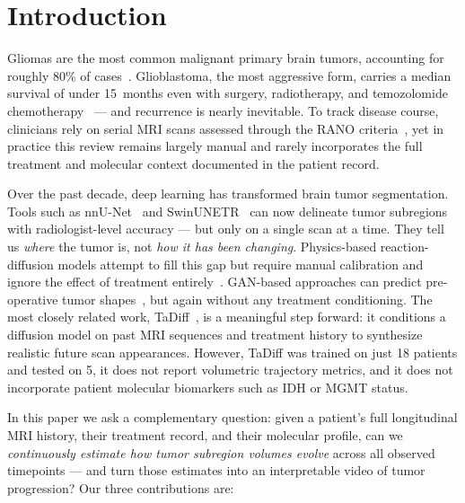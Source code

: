 \documentclass[conference]{IEEEtran}
\begin{document}
\IEEEpeerreviewmaketitle

\section{Introduction}

Gliomas are the most common malignant primary brain tumors, accounting for
roughly 80\% of cases~\cite{stupp2005glioblastoma, osborn2022who}.
Glioblastoma, the most aggressive form, carries a median survival of under
15~months even with surgery, radiotherapy, and temozolomide
chemotherapy~\cite{stupp2005glioblastoma} --- and recurrence is nearly
inevitable. To track disease course, clinicians rely on serial MRI scans
assessed through the RANO criteria~\cite{wen2010rano}, yet in practice this
review remains largely manual and rarely incorporates the full treatment and
molecular context documented in the patient record.

Over the past decade, deep learning has transformed brain tumor segmentation.
Tools such as nnU-Net~\cite{isensee2021nnunet} and
SwinUNETR~\cite{tang2022swinunetr} can now delineate tumor subregions with
radiologist-level accuracy --- but only on a single scan at a time. They tell
us \emph{where} the tumor is, not \emph{how it has been changing}. Physics-based
reaction-diffusion models attempt to fill this gap but require manual
calibration and ignore the effect of treatment entirely~\cite{liu2023tadiff}.
GAN-based approaches can predict pre-operative tumor shapes~\cite{liu2023tadiff},
but again without any treatment conditioning. The most closely related work,
TaDiff~\cite{liu2023tadiff}, is a meaningful step forward: it conditions a
diffusion model on past MRI sequences and treatment history to synthesize
realistic future scan appearances. However, TaDiff was trained on just
18 patients and tested on 5, it does not report volumetric trajectory metrics,
and it does not incorporate patient molecular biomarkers such as IDH or MGMT
status.

In this paper we ask a complementary question: given a patient's full
longitudinal MRI history, their treatment record, and their molecular profile,
can we \emph{continuously estimate how tumor subregion volumes evolve} across
all observed timepoints --- and turn those estimates into an interpretable video
of tumor progression? Our three contributions are:
\end{document}
